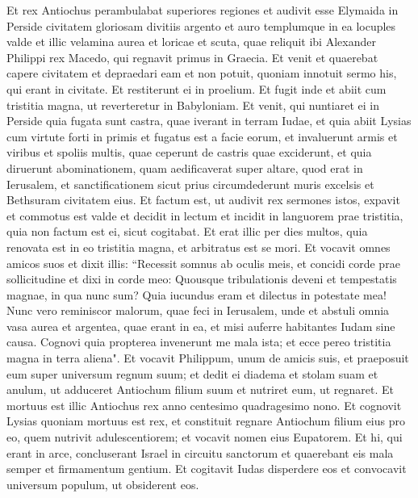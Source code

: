 \begin{biblechapter}  
\verse Et rex Antiochus perambulabat superiores regiones et audivit esse Elymaida in Perside civitatem gloriosam divitiis argento et auro 
\verse templumque in ea locuples valde et illic velamina aurea et loricae et scuta, quae reliquit ibi Alexander Philippi rex Macedo, qui regnavit primus in Graecia.  
\verse Et venit et quaerebat capere civitatem et depraedari eam et non potuit, quoniam innotuit sermo his, qui erant in civitate. 
\verse Et restiterunt ei in proelium. Et fugit inde et abiit cum tristitia magna, ut reverteretur in Babyloniam. 
\verse Et venit, qui nuntiaret ei in Perside quia fugata sunt castra, quae iverant in terram Iudae, 
\verse et quia abiit Lysias cum virtute forti in primis et fugatus est a facie eorum, et invaluerunt armis et viribus et spoliis multis, quae ceperunt de castris quae exciderunt, 
\verse et quia diruerunt abominationem, quam aedificaverat super altare, quod erat in Ierusalem, et sanctificationem sicut prius circumdederunt muris excelsis et Bethsuram civitatem eius. 
\verse Et factum est, ut audivit rex sermones istos, expavit et commotus est valde et decidit in lectum et incidit in languorem prae tristitia, quia non factum est ei, sicut cogitabat. 
\verse Et erat illic per dies multos, quia renovata est in eo tristitia magna, et arbitratus est se mori. 
\verse Et vocavit omnes amicos suos et dixit illis: “Recessit somnus ab oculis meis, et concidi corde prae sollicitudine 
\verse et dixi in corde meo: Quousque tribulationis deveni et tempestatis magnae, in qua nunc sum? Quia iucundus eram et dilectus in potestate mea! 
\verse Nunc vero reminiscor malorum, quae feci in Ierusalem, unde et abstuli omnia vasa aurea et argentea, quae erant in ea, et misi auferre habitantes Iudam sine causa. 
\verse Cognovi quia propterea invenerunt me mala ista; et ecce pereo tristitia magna in terra aliena". 
\verse Et vocavit Philippum, unum de amicis suis, et praeposuit eum super universum regnum suum; 
\verse et dedit ei diadema et stolam suam et anulum, ut adduceret Antiochum filium suum et nutriret eum, ut regnaret. 
\verse Et mortuus est illic Antiochus rex anno centesimo quadragesimo nono. 
\verse Et cognovit Lysias quoniam mortuus est rex, et constituit regnare Antiochum filium eius pro eo, quem nutrivit adulescentiorem; et vocavit nomen eius Eupatorem. 
\verse Et hi, qui erant in arce, concluserant Israel in circuitu sanctorum et quaerebant eis mala semper et firmamentum gentium. 
\verse Et cogitavit Iudas disperdere eos et convocavit universum populum, ut obsiderent eos. 

\end{biblechapter}

